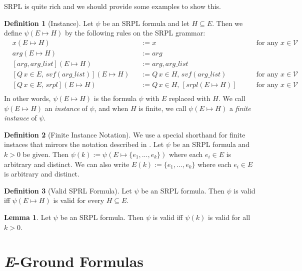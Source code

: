 \documentclass[12pt]{article}
\theoremstyle{definition}
\newtheorem{lemma}{Lemma}
\newtheorem{definition}{Definition}
\theoremstyle{remark}
\begin{document}
SRPL is quite rich and we should provide some examples to show this.

\begin{definition}[Instance]
  Let $\psi$ be an SRPL formula and let $H \subseteq E$.  Then we define $\psi(E \mapsto H)$ by the following rules on the SRPL grammar:
  \begin{align*}
    &x(E \mapsto H)& &:= x \qquad &\text{for any } x \in \mathcal{V}\\
    &arg(E \mapsto H)& &:= arg\\
    &[arg,arg\_list](E \mapsto H)& &:= arg,arg\_list\\
    &[Q \, x \in E, \, svf(arg\_list)](E \mapsto H)& &:= Q \, x \in H, \, svf(arg\_list) \qquad &\text{for any } x \in \mathcal{V}\\
    &[Q \, x \in E, \, srpl](E \mapsto H)& &:=Q \, x \in H, \, [srpl(E \mapsto H)]  \qquad &\text{for any } x \in \mathcal{V}\\
  \end{align*}
  In other words, $\psi(E \mapsto H)$ is the formula $\psi$ with $E$ replaced with $H$.  We call $\psi(E \mapsto H)$ an \textit{instance} of $\psi$, and when $H$ is finite, we call $\psi(E \mapsto H)$ a \textit{finite instance} of $\psi$.
\end{definition}

\begin{definition}[Finite Instance Notation]
  We use a special shorthand for finite instaces that mirrors the notation described in \cite{goel2021symmetry}.  Let $\psi$ be an SRPL formula and $k>0$ be given.  Then $\psi(k) := \psi(E \mapsto \{e_1,...,e_k\})$ where each $e_i \in E$ is arbitrary and distinct.  We can also write $E(k) := \{e_1,...,e_k\}$ where each $e_i \in E$ is arbitrary and distinct.
\end{definition}

\begin{definition}[Valid SPRL Formula]
  Let $\psi$ be an SRPL formula.  Then $\psi$ is valid iff $\psi(E \mapsto H)$ is valid for every $H \subseteq E$.
\end{definition}

\begin{lemma}
  \label{lem:valid-all-k}
  Let $\psi$ be an SRPL formula.  Then $\psi$ is valid iff $\psi(k)$ is valid for all $k>0$.
\end{lemma}



\section{\textit{E}-Ground Formulas}
\end{document}
